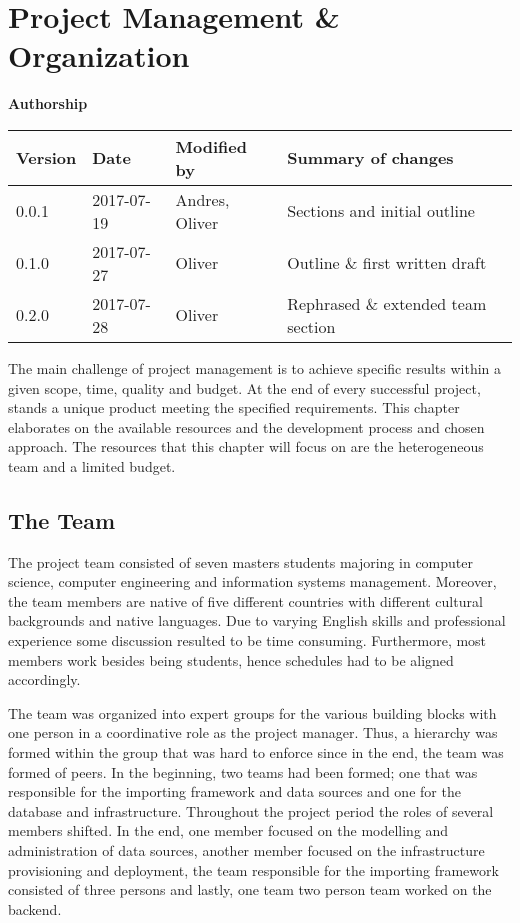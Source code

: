 \section{Project Management \&
Organization}\label{project-management-organization}

\textbf{Authorship}

\begin{longtable}[]{@{}llll@{}}
\toprule
Version & Date & Modified by & Summary of changes\tabularnewline
\midrule
\endhead
0.0.1 & 2017-07-19 & Andres, Oliver & Sections and initial
outline\tabularnewline
0.1.0 & 2017-07-27 & Oliver & Outline \& first written
draft\tabularnewline
0.2.0 & 2017-07-28 & Oliver & Rephrased \& extended team
section\tabularnewline
\bottomrule
\end{longtable}

The main challenge of project management is to achieve specific results
within a given scope, time, quality and budget. At the end of every
successful project, stands a unique product meeting the specified
requirements. This chapter elaborates on the available resources and the
development process and chosen approach. The resources that this chapter
will focus on are the heterogeneous team and a limited budget.

\subsection{The Team}\label{the-team}

The project team consisted of seven masters students majoring in
computer science, computer engineering and information systems
management. Moreover, the team members are native of five different
countries with different cultural backgrounds and native languages. Due
to varying English skills and professional experience some discussion
resulted to be time consuming. Furthermore, most members work besides
being students, hence schedules had to be aligned accordingly.

The team was organized into expert groups for the various building
blocks with one person in a coordinative role as the project manager.
Thus, a hierarchy was formed within the group that was hard to enforce
since in the end, the team was formed of peers. In the beginning, two
teams had been formed; one that was responsible for the importing
framework and data sources and one for the database and infrastructure.
Throughout the project period the roles of several members shifted. In
the end, one member focused on the modelling and administration of data
sources, another member focused on the infrastructure provisioning and
deployment, the team responsible for the importing framework consisted
of three persons and lastly, one team two person team worked on the
backend.

